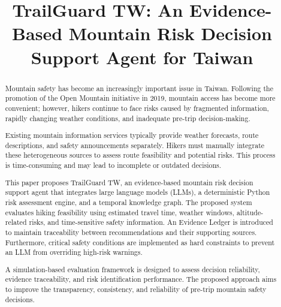 \documentclass[conference]{IEEEtran}
\begin{document}
\title{TrailGuard TW: An Evidence-Based Mountain Risk Decision Support Agent for Taiwan}

\author{
}

\maketitle

\begin{abstract}
Mountain safety has become an increasingly important issue in Taiwan.
Following the promotion of the Open Mountain initiative in 2019,
mountain access has become more convenient; however, hikers continue
to face risks caused by fragmented information, rapidly changing
weather conditions, and inadequate pre-trip decision-making.

Existing mountain information services typically provide weather
forecasts, route descriptions, and safety announcements separately.
Hikers must manually integrate these heterogeneous sources to assess
route feasibility and potential risks. This process is time-consuming
and may lead to incomplete or outdated decisions.

This paper proposes TrailGuard TW, an evidence-based mountain risk
decision support agent that integrates large language models (LLMs),
a deterministic Python risk assessment engine, and a temporal
knowledge graph. The proposed system evaluates hiking feasibility
using estimated travel time, weather windows, altitude-related risks,
and time-sensitive safety information. An Evidence Ledger is
introduced to maintain traceability between recommendations and
their supporting sources. Furthermore, critical safety conditions
are implemented as hard constraints to prevent an LLM from overriding
high-risk warnings.

A simulation-based evaluation framework is designed to assess
decision reliability, evidence traceability, and risk identification
performance. The proposed approach aims to improve the transparency,
consistency, and reliability of pre-trip mountain safety decisions.
\end{abstract}
\end{document}
